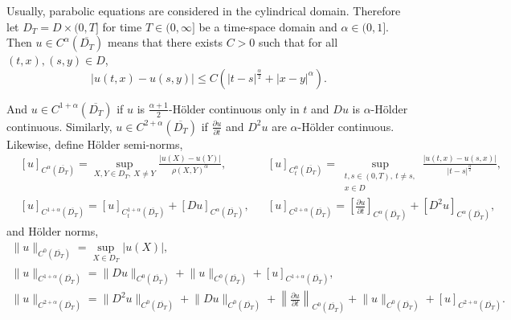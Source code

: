 \documentclass[11pt]{amsart}
\numberwithin{equation}{section}
\theoremstyle{plain}
\theoremstyle{definition}
\begin{document}
Usually, parabolic equations are considered in the cylindrical domain. Therefore let $D_T=D \times (0,T]$ for time $T \in (0,\infty]$ be a time-space domain and $\alpha \in (0,1]$. Then $u \in C^{\alpha}(\overline{D_T})$ means that there exists $C>0$ such that for all $(t,x), (s,y) \in D$,
\begin{equation*}
	\lvert u(t,x)-u(s,y)\rvert \leq C(\lvert t-s \rvert ^\frac{\alpha}{2}+\lvert x-y \rvert ^\alpha).
\end{equation*}

And $u \in C^{1+\alpha}(\overline{D_T})$ if $u$ is $\frac{\alpha +1}{2}$-H\"older continuous only in $t$ and $Du$ is $\alpha$-H\"older continuous. Similarly, $u \in C^{2+\alpha}(\overline{D_T})$ if $\frac{\partial u}{\partial t}$ and $D^2u$ are $\alpha$-H\"older continuous.
Likewise, define H\"older semi-norms,
\begin{equation*}
\begin{aligned}
	&[u]_{C^{\alpha}(\overline{D_T})}=\sup_{X,Y\in D_T,\ X \neq Y} \frac{\lvert u(X)-u(Y) \rvert}{{\rho (X,Y)}^\alpha},
	&&[u]_{C_t^{\alpha}(\overline{D_T})}=\sup_{\substack{t,s \in (0,T),\ t\neq s,\\ x\in D}}\frac{\lvert u(t,x)-u(s,x) \rvert}{\lvert t-s \rvert ^\frac{\alpha}{2}},\\
	&[u]_{C^{1+\alpha}(\overline{D_T})}=[u]_{C^{1+\alpha}_t(\overline{D_T})}+[Du]_{C^\alpha(\overline{D_T})},
	&&[u]_{C^{2+\alpha}(\overline{D_T})}=\left[\frac{\partial u}{\partial t}\right]_{C^\alpha(\overline{D_T})}+[D^2u]_{C^\alpha(\overline{D_T})},
\end{aligned}
\end{equation*}
and H\"older norms,
\begin{equation*}
\begin{gathered}
	\lVert u \rVert_{C^0(\overline{D_T})}=\sup_{X \in D_T} \lvert u(X) \rvert, \\
	\lVert u \rVert_{C^{1+\alpha}(\overline{D_T})}=\lVert Du \rVert_{C^0(\overline{D_T})}+\lVert u\rVert_{C^0(\overline{D_T})}+[u]_{C^{1+\alpha}(\overline{D_T})}, \\
	\lVert u \rVert_{C^{2+\alpha}(\overline{D_T})}=\lVert D^2u \rVert_{C^0(\overline{D_T})}+\lVert Du\rVert_{C^0(\overline{D_T})}+\left \lVert \frac{\partial u}{\partial t} \right \rVert_{C^0(\overline{D_T})}+\lVert u\rVert_{C^0(\overline{D_T})}+[u]_{C^{2+\alpha}(\overline{D_T})}.
\end{gathered}
\end{equation*}
\end{document}
